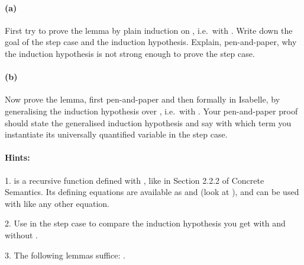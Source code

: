\begin{isabellebody}
\begin{isamarkuptext}
\paragraph{(a)} First try to prove the lemma by plain induction on , i.e.\ with
  . Write down the goal of the step case and the induction hypothesis. Explain,
  pen-and-paper, why the induction hypothesis is not strong enough to prove the step case.

 \paragraph{(b)} Now prove the lemma, first pen-and-paper and then formally in Isabelle, by
  generalising the induction hypothesis over , i.e.\ with .
  Your pen-and-paper proof should state the generalised induction hypothesis and say with which term
  you instantiate its universally quantified variable in the step case.

\paragraph{Hints:}
 1.  is a recursive function defined with , like  in Section 2.2.2 of
    Concrete Semantics. Its defining equations are available as  and
     (look at ), and can be used with  like any
    other equation.

 2. Use  in the step case to compare the induction hypothesis you get with and without
    .

 3. The following lemmas suffice: .%
\end{isamarkuptext}\isamarkuptrue%
%
\isadelimproof
%
\endisadelimproof
%
\isatagproof
%
\endisatagproof
{\isafoldproof}%
%
\isadelimproof
%
\endisadelimproof
%
\begin{isamarkuptext}%

\end{isamarkuptext}
\end{isabellebody}
